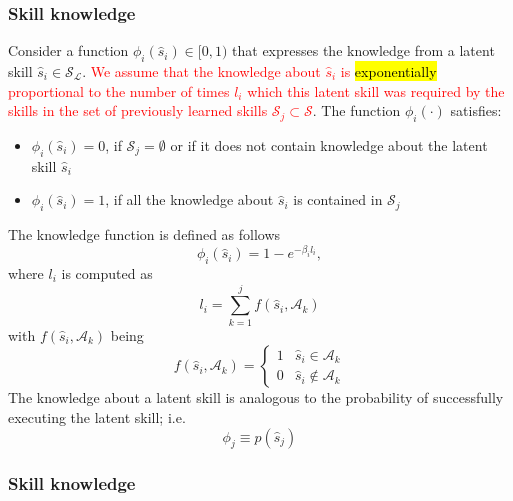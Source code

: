 \subsubsection{Skill knowledge}

Consider a function ${\phi}_i(\hat{s}_i)\in [0,1)$ that expresses the knowledge from a latent skill  $\hat{s}_i \in \mathcal{S}_\mathcal{L}$. \textcolor{red}{We assume that the knowledge about $\hat{s}_i$ is \hl{exponentially} proportional to the number of times $ l_i $ which this latent skill was required by the skills in the set of previously learned skills $\mathcal{S}_j \subset \mathcal{S}$}.
The function ${\phi}_i(\cdot)$ satisfies:
\begin{itemize}
	\item ${\phi}_i(\hat{s}_i) = 0$, if $\mathcal{S}_j=\emptyset$ or if it does not contain knowledge about the latent skill $\hat{s}_i$
	\item ${\phi}_i(\hat{s}_i) = 1$, if all the knowledge about $\hat{s}_i$ is contained in $\mathcal{S}_j$
\end{itemize} 
The knowledge function is defined as follows
\begin{equation}\label{eq:knowledge_function}
\phi_i(\hat{s}_i) = 1 - e^{-\beta_i l_i},
\end{equation}
where $ l_i $ is computed as
\begin{equation}\label{eq:repetition_summation}
l_i = \sum_{k = 1}^{j} f(\hat{s}_i,\mathcal{A}_k)
\end{equation}
with $ f(\hat{s}_i,\mathcal{A}_k) $ being
\begin{equation}\label{eq:repetition}
f(\hat{s}_i,\mathcal{A}_k) =
\begin{cases} 
1 & \hat{s}_i \in \mathcal{A}_k\\
0 & \hat{s}_i \notin \mathcal{A}_k
\end{cases}
\end{equation}
The knowledge about a latent skill is analogous to the probability of successfully executing the latent skill; i.e. 
\begin{equation*}
\phi_j \equiv p(\hat{s}_j)
\end{equation*}

\subsubsection{Skill knowledge}

